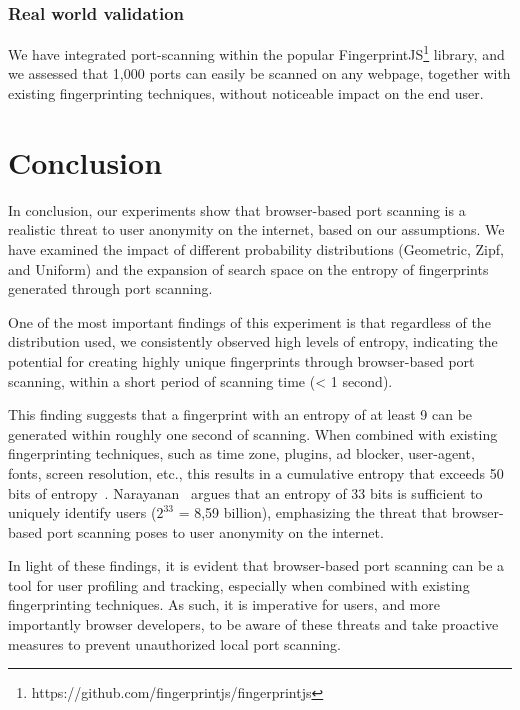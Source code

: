 \subsubsection{Real world validation}

We have integrated port-scanning within the popular FingerprintJS\footnote{https://github.com/fingerprintjs/fingerprintjs} library, and we assessed that 1,000 ports can easily be scanned on any webpage, together with existing fingerprinting techniques, without noticeable impact on the end user. 


\section{Conclusion}

In conclusion, our experiments show that browser-based port scanning is a realistic threat to user anonymity on the internet, based on our assumptions. We have examined the impact of different probability distributions (Geometric, Zipf, and Uniform) and the expansion of search space on the entropy of fingerprints generated through port scanning.

One of the most important findings of this experiment is that regardless of the distribution used, we consistently observed high levels of entropy, indicating the potential for creating highly unique fingerprints through browser-based port scanning, within a short period of scanning time (< 1 second).

This finding suggests that a fingerprint with an entropy of at least 9 can be generated within roughly one second of scanning. When combined with existing fingerprinting techniques, such as time zone, plugins, ad blocker, user-agent, fonts, screen resolution, etc., this results in a cumulative entropy that exceeds 50 bits of entropy~\cite{gomez2018}. Narayanan~\cite{narayanan201233} argues that an entropy of 33 bits is sufficient to uniquely identify users ($2^{33}$ = 8,59 billion), emphasizing the threat that browser-based port scanning poses to user anonymity on the internet.

In light of these findings, it is evident that browser-based port scanning can be a tool for user profiling and tracking, especially when combined with existing fingerprinting techniques. As such, it is imperative for users, and more importantly browser developers, to be aware of these threats and take proactive measures to prevent unauthorized local port scanning.







